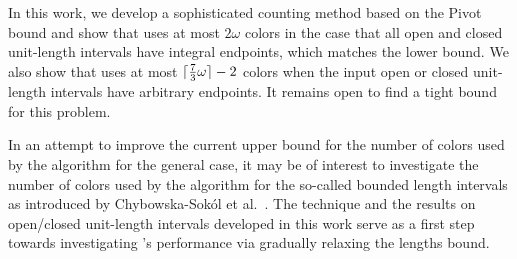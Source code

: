 In this work, we develop a sophisticated counting method based on the Pivot bound and show that \ff{} uses at most $2\omega$ colors in the case that all open and closed unit-length intervals have integral endpoints, which matches the lower bound.
We also show that \ff{} uses at most $\lceil \frac{7}{3}\omega \rceil - 2$ colors when the input open or closed unit-length intervals have arbitrary endpoints.
It remains open to find a tight bound for this problem.

In an attempt to improve the current upper bound for the number of colors used by the \ff{} algorithm for the general case, it may be of interest to investigate the number of colors used by the \ff algorithm for the so-called bounded length intervals as introduced by Chybowska-Sok\'{o}l et al.~\cite{DBLP:journals/ejc/ChybowskaSokol24}.
The technique and the results on open/closed unit-length intervals developed in this work serve as a first step towards investigating \ff's performance via gradually relaxing the lengths bound.
